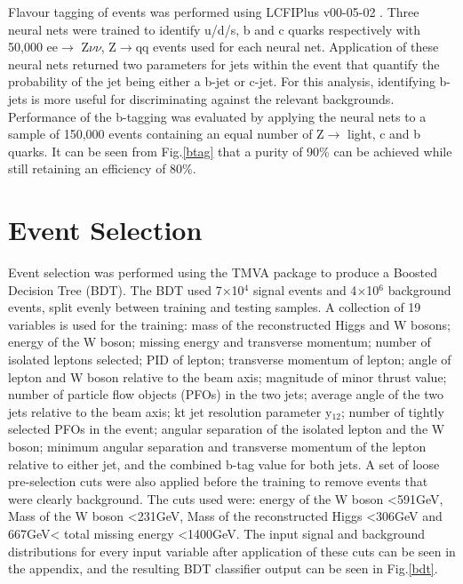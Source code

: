 Flavour tagging of events was performed using LCFIPlus v00-05-02 \cite{Suehara:2015ura}. Three neural nets were trained to identify u/d/s, b and c quarks respectively with 50,000 ee$\rightarrow$ Z$\nu\nu$, Z$\rightarrow$qq events used for each neural net. Application of these neural nets returned two parameters for jets within the event that quantify the probability of the jet being either a b-jet or c-jet. For this analysis, identifying b-jets is more useful for discriminating against the relevant backgrounds. Performance of the b-tagging was evaluated by applying the neural nets to a sample of 150,000 events containing an equal number of Z$\rightarrow$ light, c and b quarks. It can be seen from Fig.\ref{btag} that a purity of 90\% can be achieved while still retaining an efficiency of 80\%.

\section{Event Selection}

Event selection was performed using the TMVA package \cite{2007physics...3039H} to produce a Boosted Decision Tree (BDT). The BDT used 7$\times$10$^4$ signal events and 4$\times$10$^6$ background events, split evenly between training and testing samples. A collection of 19 variables is used for the training: mass of the reconstructed Higgs and W bosons; energy of the W boson; missing energy and transverse momentum; number of isolated leptons selected; PID of lepton; transverse momentum of lepton; angle of lepton and W boson relative to the beam axis; magnitude of minor thrust value; number of particle flow objects (PFOs) in the two jets; average angle of the two jets relative to the beam axis; kt jet resolution parameter y$_{12}$; number of tightly selected PFOs in the event; angular separation of the isolated lepton and the W boson;  minimum angular separation and transverse momentum of the lepton relative to either jet, and the combined b-tag value for both jets. A set of loose pre-selection cuts were also applied before the training to remove events that were clearly background. The cuts used were: energy of the W boson <591GeV, Mass of the W boson <231GeV, Mass of the reconstructed Higgs <306GeV and 667GeV< total missing energy <1400GeV. The input signal and background distributions for every input variable after application of these cuts can be seen in the appendix, and the resulting BDT classifier output can be seen in Fig.\ref{bdt}.  

